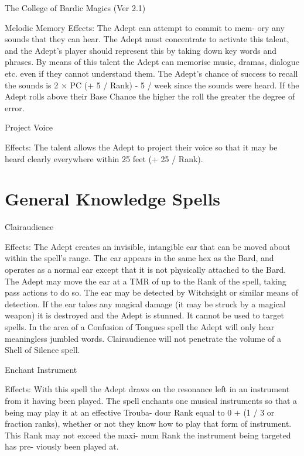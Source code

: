 \begin{Chapter}{The College of Bardic Magics (Ver 2.1)}
\begin{talent}[T-3]{Melodic Memory }
Effects: The Adept can attempt to commit to mem-
ory any sounds that they can hear. The Adept must 
concentrate  to  activate  this  talent,  and  the  Adept’s 
player  should  represent  this  by  taking  down  key 
words  and  phrases.  By  means  of  this  talent  the 
Adept  can  memorise  music,  dramas,  dialogue  etc. 
even  if  they  cannot  understand  them.  The  Adept’s 
chance of success to recall the sounds is 2 × PC (+ 
5 / Rank) - 5 / week since the sounds were heard. If 
the Adept rolls above their Base Chance the higher 
the roll the greater the degree of error. 
\end{talent}

\begin{talent}[T-4]{Project Voice }

Effects: The talent allows the Adept to project their 
voice  so  that  it  may  be  heard  clearly  everywhere 
within 25 feet (+ 25 / Rank). 
\end{talent}


\section{General Knowledge Spells}

\begin{spell}[G-1]{Clairaudience }


Effects: The Adept creates an invisible, intangible ear that can be
moved about within the spell’s range. The ear appears in the same hex
as the Bard, and operates as a normal ear except that it is not
physically attached to the Bard.  The Adept may move the ear at a TMR
of up to the Rank of the spell, taking pass actions to do so. The ear
may be detected by Witchsight or similar means of detection.  If the
ear takes any magical damage (it may be struck by a magical weapon) it
is destroyed and the Adept is stunned.  It cannot be used to target
spells. In the area of a Confusion of Tongues spell the Adept will
only hear meaningless jumbled words. Clairaudience will not penetrate
the volume of a Shell of Silence spell.
\end{spell}

\begin{spell}[G-2]{Enchant Instrument }

Effects:  With  this  spell  the  Adept  draws  on  the 
resonance left in an instrument from it having been 
played. The spell enchants one musical instruments 
so that a being may play it at an effective Trouba-
dour  Rank  equal  to  0  +  (1  /  3  or  fraction  ranks), 
whether or not they know how to play that form of 
instrument.  This  Rank  may  not  exceed  the  maxi-
mum  Rank  the  instrument  being  targeted  has  pre-
viously been played at. 
\end{spell}


\end{Chapter}
